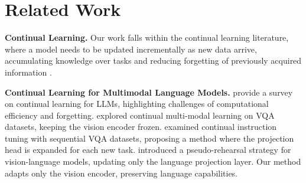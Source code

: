 \section{Related Work}\label{sec:related_work}


\textbf{Continual Learning.} Our work falls within the continual learning literature, where a model needs to be updated incrementally as new data arrive, accumulating knowledge over tasks and reducing forgetting of previously acquired information \cite{de2021continual}.

\textbf{Continual Learning for Multimodal Language Models.} \citet{wu2024continual} provide a survey on continual learning for LLMs, highlighting challenges of computational efficiency and forgetting. \citet{srivastava2024improving} explored continual multi-modal learning on VQA datasets, keeping the vision encoder frozen. \citet{he2023continual} examined continual instruction tuning with sequential VQA datasets, proposing a method where the projection head is expanded for each new task. \citet{das2024one} introduced a pseudo-rehearsal strategy for vision-language models, updating only the language projection layer. Our method adapts only the vision encoder, preserving language capabilities.

